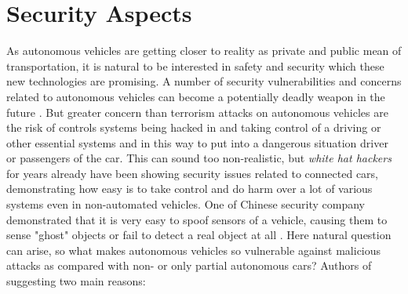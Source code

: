 \chapter{Security Aspects}
\label{chap:5}
%
As autonomous vehicles are getting closer to reality as private and public mean of transportation, it is natural to be interested in safety and security which these new technologies are promising. A number of security vulnerabilities and concerns related to autonomous vehicles can become a potentially deadly weapon in the future \cite{selfDrivingCarSec}. But greater concern than terrorism attacks on autonomous vehicles are the risk of controls systems being hacked in and taking control of a driving or other essential systems and in this way to put into a dangerous situation driver or passengers of the car. 
This can sound too non-realistic, but \textit{white hat hackers} for years already have been showing security issues related to connected cars, demonstrating how easy is to take control and do harm over a lot of various systems even in non-automated vehicles. One of Chinese security company demonstrated that it is very easy to spoof sensors of a vehicle, causing them to sense "ghost" objects or fail to detect a real object at all \cite{ChinaAttack}.
Here natural question can arise, so what makes autonomous vehicles so vulnerable against malicious attacks as compared with non- or only partial autonomous cars? Authors of \cite{sec} suggesting two main reasons:
